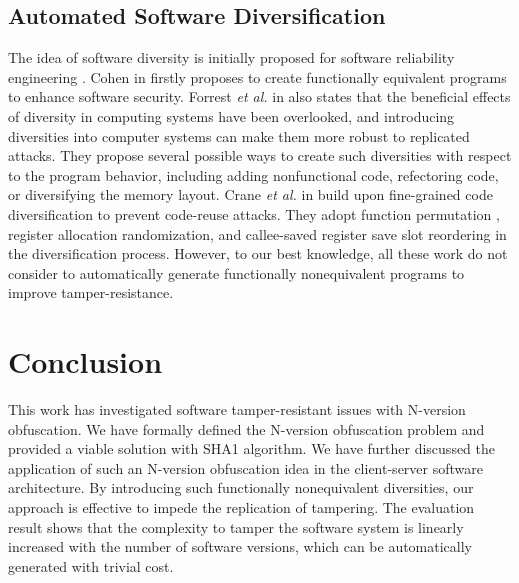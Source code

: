 \documentclass[10pt, conference]{IEEEtran}
\begin{document}
\subsection{Automated Software Diversification}

The idea of software diversity is initially proposed for software reliability engineering \cite{lyu1996handbook}.  Cohen in \cite{cohen1993operating} firstly proposes to create functionally equivalent programs to enhance software security.  Forrest \textit{et al.} in \cite{forrest1997building} also states that the beneficial effects of diversity in computing systems have been overlooked, and introducing diversities into computer systems can make them more robust to replicated attacks.  They propose several possible ways to create such diversities with respect to the program behavior, including adding nonfunctional code, refectoring code, or diversifying the memory layout.  Crane \textit{et al.} in \cite{crane2015readactor} build upon fine-grained code diversification to prevent code-reuse attacks.  They adopt function permutation \cite{kil2006address}, register allocation randomization, and callee-saved register save slot reordering \cite{pappas2012smashing} in the diversification process.  However, to our best knowledge, all these work do not consider to automatically generate functionally nonequivalent programs to improve tamper-resistance.

\section{Conclusion} \label{section:conclusion}
This work has investigated software tamper-resistant issues with N-version obfuscation.  We have formally defined the N-version obfuscation problem and provided a viable solution with SHA1 algorithm.  We have further discussed the application of such an N-version obfuscation idea in the client-server software architecture.  By introducing such functionally nonequivalent diversities, our approach is effective to impede the replication of tampering.  The evaluation result shows that the complexity to tamper the software system is linearly increased with the number of software versions, which can be automatically generated with trivial cost.



\end{document}
